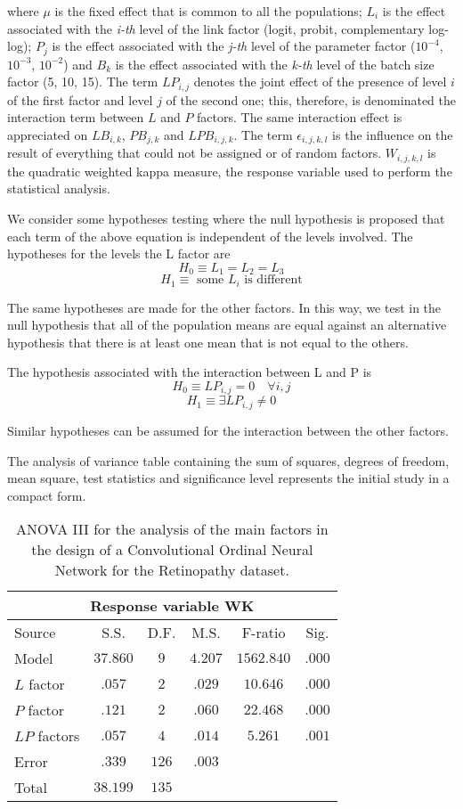 \documentclass[10pt, a4paper, titlepage, twocolumn]{article}
\begin{document}
	where $\mu$ is the fixed effect that is common to all the populations; $L_i$ is the effect associated with the \textit{i-th} level of the link factor (logit, probit, complementary log-log); $P_j$ is the effect associated with the \textit{j-th} level of the parameter factor ($10^{-4}$, $10^{-3}$, $10^{-2}$) and $B_k$ is the effect associated with the \textit{k-th} level of the batch size factor (5, 10, 15). The term $LP_{i,j}$ denotes the joint effect of the presence of level $i$ of the first factor and level $j$ of the second one; this, therefore, is denominated the interaction term between $L$ and $P$ factors. The same interaction effect is appreciated on $LB_{i,k}$, $PB_{j,k}$ and $LPB_{i,j,k}$. The term $\epsilon_{i,j,k,l}$ is the influence on the result of everything that could not be assigned or of random factors. $W_{i,j,k,l}$ is the quadratic weighted kappa measure, the response variable used to perform the statistical analysis.
	
	We consider some hypotheses testing where the null hypothesis is proposed that each term of the above equation is independent of the levels involved. The hypotheses for the levels the L factor are
	\[
		H_0 \equiv L_1 = L_2 = L_3
	\]
	\[
		H_1 \equiv \text{ some } L_i \text{ is different}
	\]
	
	The same hypotheses are made for the other factors. In this way, we test in the null hypothesis that all of the population means are equal against an alternative hypothesis that there is at least one mean that is not equal to the others.
	
	The hypothesis associated with the interaction between L and P is
	\[
		H_0 \equiv LP_{i,j} = 0 \quad \forall i,j
	\]
	\[
		H_1 \equiv \exists LP_{i,j} \ne 0
	\]
	
	Similar hypotheses can be assumed for the interaction between the other factors.
	
	The analysis of variance table containing the sum of squares, degrees of freedom, mean square, test statistics and significance level represents the initial study in a compact form.
	
	\begin{table}[ht]
		\centering
		\small
		\begin{tabular}{l|ccccc}
			\multicolumn{6}{c}{Response variable WK}\\\hline
			Source & S.S. & D.F. & M.S. & F-ratio & Sig.\\\hline
			Model & $37.860$ & $9$ & $4.207$ & $1562.840$ & $.000$\\
			$L$ factor & $.057$ & $2$ & $.029$ & $10.646$ & $.000$\\
			$P$ factor & $.121$ & $2$ & $.060$ & $22.468$ & $.000$\\
			$LP$ factors & $.057$ & $4$ & $.014$ & $5.261$ & $.001$\\
			Error & $.339$ & $126$ & $.003$ & & \\
			Total & $38.199$ & $135$ & & & 
		\end{tabular}
		\caption{ANOVA III for the analysis of the main factors in the design of a Convolutional Ordinal Neural Network for the Retinopathy dataset.}
		\label{table:ANOVARetinopathy}
	\end{table}
	
\end{document}
